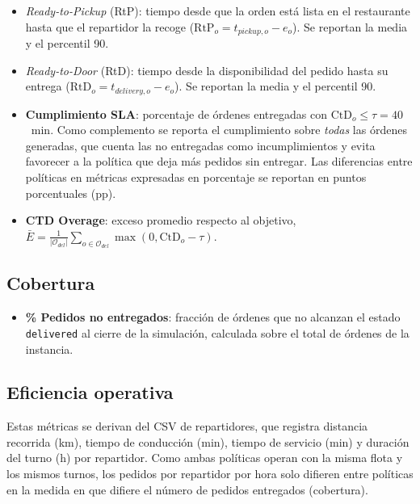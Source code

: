 \documentclass[12pt,letterpaper,oneside]{book}
\begin{document}
	\begin{itemize}
		\item \textit{Ready-to-Pickup} (RtP): tiempo desde que la orden está lista en
		      el restaurante hasta que el repartidor la recoge
		      ($\text{RtP}_o = t_{pickup,o} - e_o$).
		      Se reportan la media y el percentil 90.
		\item \textit{Ready-to-Door} (RtD): tiempo desde la disponibilidad del pedido
		      hasta su entrega ($\text{RtD}_o = t_{delivery,o} - e_o$).
		      Se reportan la media y el percentil 90.
		\item \textbf{Cumplimiento SLA}: porcentaje de órdenes entregadas con
		      $\text{CtD}_o \leq \tau = 40$~min.  Como complemento se reporta el
		      cumplimiento sobre \emph{todas} las órdenes generadas, que cuenta las no
		      entregadas como incumplimientos y evita favorecer a la política que deja
		      más pedidos sin entregar.  Las diferencias entre políticas en métricas
		      expresadas en porcentaje se reportan en puntos porcentuales (pp).
		\item \textbf{CTD Overage}: exceso promedio respecto al objetivo,
		      $\bar{E} = \frac{1}{|\mathcal{O}_{del}|}\sum_{o \in \mathcal{O}_{del}} \max(0, \text{CtD}_o - \tau)$.
	\end{itemize}

	\subsection{Cobertura}

	\begin{itemize}
		\item \textbf{\% Pedidos no entregados}: fracción de órdenes que no alcanzan
		      el estado \texttt{delivered} al cierre de la simulación, calculada
		      sobre el total de órdenes de la instancia.
	\end{itemize}

	\subsection{Eficiencia operativa}

	Estas métricas se derivan del CSV de repartidores, que registra distancia
	recorrida (km), tiempo de conducción (min), tiempo de servicio (min) y duración
	del turno (h) por repartidor.  Como ambas políticas operan con la misma flota y los
	mismos turnos, los pedidos por repartidor por hora solo difieren entre políticas en la
	medida en que difiere el número de pedidos entregados (cobertura).
\end{document}
